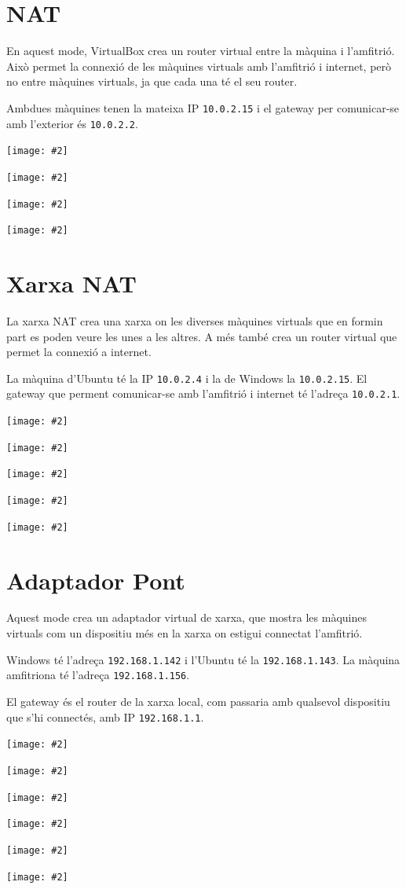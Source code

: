 \documentclass[a4paper,12pt]{article}
\newcommand{\mygraphic}[2][height=0.45\textheight]{\begin{center}
		\centering\texttt{[image: \#2]}\par
\end{center}}
\begin{document}


\tableofcontents
\newpage

\section{NAT}
En aquest mode, VirtualBox crea un router virtual entre la màquina i l'amfitrió. Això permet la connexió de les màquines virtuals amb l'amfitrió i internet, però no entre màquines virtuals, ja que cada una té el seu router. 

Ambdues màquines tenen la mateixa IP \texttt{10.0.2.15} i el gateway per comunicar-se amb l'exterior és \texttt{10.0.2.2}.

\mygraphic{imatges/a1.png}
\mygraphic{imatges/a2.png}
\mygraphic{imatges/a3.png}
\mygraphic{imatges/a4.png}

\newpage
\section{Xarxa NAT}
La xarxa NAT crea una xarxa on les diverses màquines virtuals que en formin part es poden veure les unes a les altres. A més també crea un router virtual que permet la connexió a internet.

La màquina d'Ubuntu té la IP \texttt{10.0.2.4} i la de Windows la \texttt{10.0.2.15}. El gateway que perment comunicar-se amb l'amfitrió i internet té l'adreça \texttt{10.0.2.1}.

\mygraphic{imatges/b1.png}
\mygraphic{imatges/b2.png}
\mygraphic{imatges/b3.png}
\mygraphic{imatges/b4.png}
\mygraphic{imatges/b5.png}

\newpage
\section{Adaptador Pont}
Aquest mode crea un adaptador virtual de xarxa, que mostra les màquines virtuals com un dispositiu més en la xarxa on estigui connectat l'amfitrió.

Windows té l'adreça \texttt{192.168.1.142} i l'Ubuntu té la \texttt{192.168.1.143}. La màquina amfitriona té l'adreça \texttt{192.168.1.156}.

El gateway és el router de la xarxa local, com passaria amb qualsevol dispositiu que s'hi connectés, amb IP \texttt{192.168.1.1}.

\mygraphic{imatges/c1.png}
\mygraphic{imatges/c2.png}
\mygraphic[width=0.9\textwidth]{imatges/c3.png}
\mygraphic{imatges/c4.png}
\mygraphic{imatges/c5.png}
\mygraphic{imatges/c6.png}
\end{document}
